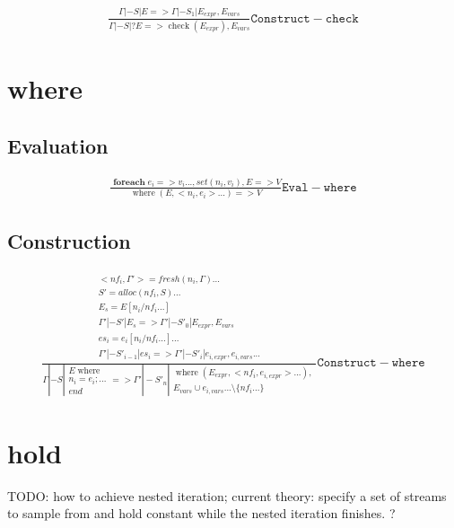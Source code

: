 \documentclass{scrartcl}
\DeclareMathOperator{\checkop}{check}
\DeclareMathOperator{\where}{where}
\DeclareMathOperator{\foreach}{\mathbf{foreach}}
\begin{document}
    \begin{align*}
        \frac{
            \Gamma |- S | E => \Gamma |- S_1 | E_{expr}, E_{vars}
        }{
            \Gamma |- S | ?E => \checkop(E_{expr}), E_{vars}
        }\mathtt{Construct-check}
    \end{align*}
    
    \section{where}
    
    \subsection{Evaluation}
    
    \begin{align*}
        \frac{
            \foreach e_i => v_i..., set(n_i, v_i), E => V
        }{
            \where(E, <n_i, e_i>...) => V
        }\mathtt{Eval-where}
    \end{align*}
    
    \subsection{Construction}
    
    \begin{align*}
    \frac{
            \begin{matrix}
                <nf_i, \Gamma'> = fresh(n_i, \Gamma)... \\
                S' = alloc(nf_i, S)...\\
                E_s = E[n_i/nf_i...] \\
                \Gamma' |- S' | E_s => \Gamma' |- S'_0 | E_{expr}, E_{vars} \\
                es_i = e_i[n_i/nf_i...]... \\
                \Gamma' |- S'_{i-1} | es_i => \Gamma' |- S'_i | e_{i, expr}, e_{i,vars}...
            \end{matrix}
        }{
            \Gamma |- S \left| 
            \begin{array}{l}
                E \where \\
                n_i = e_i; ... \\ 
                end
            \end{array}
            \right. => \Gamma' |- S'_n \left| 
            \begin{matrix}
                \where(E_{expr}, <nf_i, e_{i, expr}>...), \\
                E_{vars} \cup e_{i,vars}... \setminus \{nf_i...\}
            \end{matrix}
            \right.
        }\mathtt{Construct-where}
    \end{align*}
    
    \section{hold}
    
    TODO: how to achieve nested iteration; current theory: specify a set of streams to sample
    from and hold constant while the nested iteration finishes. ?
    
\end{document}
